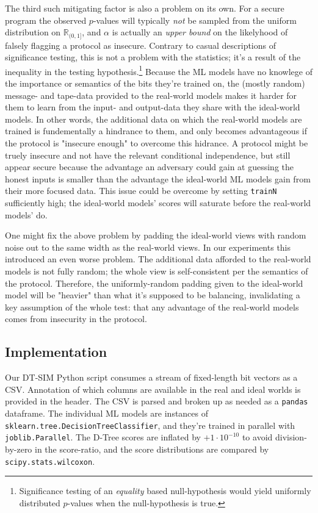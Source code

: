 \documentclass[compsoc, conference, a4paper, 10pt, times]{IEEEtran}
\newcommand{\toolname}{\textsc{DT-SIM}\xspace}
\begin{document}
The third such mitigating factor is also a problem on its own.
For a secure program the observed $p$-values
will typically \textit{not} be sampled from the uniform distribution on $\mathbb{R}_{(0,1]}$,
and $\alpha$ is actually an \textit{upper bound} on the likelyhood of falsely flagging a protocol as insecure.
Contrary to casual descriptions of significance testing, this is not a problem with the statistics;
it's a result of the inequality in the testing hypothesis.\footnote{
    Significance testing of an \textit{equality} based null-hypothesis would yield uniformly distributed $p$-values when the null-hypothesis is true.
}
Because the ML models have no knowlege of the importance or semantics of the bits they're trained on,
the (mostly random) message- and tape-data provided to the real-world models makes it harder for them
to learn from the input- and output-data they share with the ideal-world models.
In other words, the additional data on which the real-world models are trained is fundementally a hindrance to them,
and only becomes advantageous if the protocol is "insecure enough" to overcome this hidrance.
A protocol might be truely insecure and not have the relevant conditional independence,
but still appear secure because the advantage an adversary could gain at guessing the honest inputs
is smaller than the advantage the ideal-world ML models gain from their more focused data.
This issue could be overcome by setting \texttt{trainN} sufficiently high;
the ideal-world models' scores will saturate before the real-world models' do.

One might fix the above problem by padding the ideal-world views with random noise out to the same width as the real-world views.
In our experiments this introduced an even worse problem.
The additional data afforded to the real-world models is not fully random;
the whole view is self-consistent per the semantics of the protocol.
Therefore, the uniformly-random padding given to the ideal-world model will be "heavier" than what it's supposed to be balancing,
invalidating a key assumption of the whole test:
that any advantage of the real-world models comes from insecurity in the protocol.

\subsection{Implementation}

Our \toolname Python script consumes a stream of fixed-length bit vectors as a CSV.
Annotation of which columns are available in the real and ideal worlds is provided in the header.
The CSV is parsed and broken up as needed as a \texttt{pandas} dataframe.
The individual ML models are instances of \texttt{sklearn.tree.DecisionTreeClassifier},
and they're trained in parallel with \texttt{joblib.Parallel}.
The D-Tree scores are inflated by $+1 \cdot 10^{-10}$ to avoid division-by-zero in the score-ratio,
and the score distributions are compared by \texttt{scipy.stats.wilcoxon}.
\end{document}
